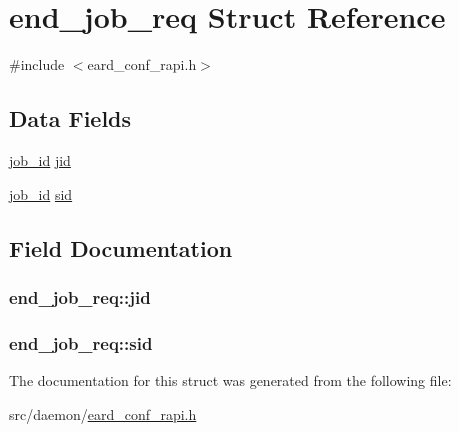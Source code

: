 \hypertarget{structend__job__req}{}\section{end\+\_\+job\+\_\+req Struct Reference}
\label{structend__job__req}


{\ttfamily \#include $<$eard\+\_\+conf\+\_\+rapi.\+h$>$}

\subsection*{Data Fields}
\begin{DoxyCompactItemize}
\item 
\hyperlink{generic_8h_aa17a8e6cdc1860741119dc46c1777778}{job\+\_\+id} \hyperlink{structend__job__req_a47ffb999255ddb8035c0050094c6b66f}{jid}
\item 
\hyperlink{generic_8h_aa17a8e6cdc1860741119dc46c1777778}{job\+\_\+id} \hyperlink{structend__job__req_a0067fd2d9c902c445a0efb8a622b9474}{sid}
\end{DoxyCompactItemize}


\subsection{Field Documentation}
\subsubsection[{\texorpdfstring{jid}{jid}}]{ end\+\_\+job\+\_\+req\+::jid}\hypertarget{structend__job__req_a47ffb999255ddb8035c0050094c6b66f}{}\label{structend__job__req_a47ffb999255ddb8035c0050094c6b66f}
\subsubsection[{\texorpdfstring{sid}{sid}}]{ end\+\_\+job\+\_\+req\+::sid}\hypertarget{structend__job__req_a0067fd2d9c902c445a0efb8a622b9474}{}\label{structend__job__req_a0067fd2d9c902c445a0efb8a622b9474}


The documentation for this struct was generated from the following file\+:\begin{DoxyCompactItemize}
\item 
src/daemon/\hyperlink{eard__conf__rapi_8h}{eard\+\_\+conf\+\_\+rapi.\+h}\end{DoxyCompactItemize}
